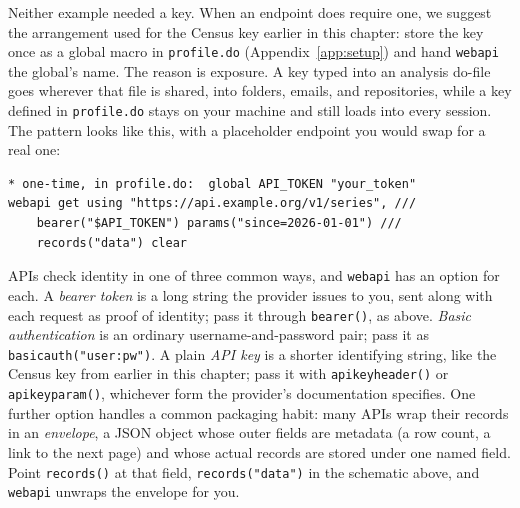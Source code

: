 Neither example needed a key. When an endpoint does require one, we suggest the arrangement used for the Census key earlier in this chapter: store the key once as a global macro in \texttt{profile.do} (Appendix~\ref{app:setup}) and hand \texttt{webapi} the global's name. The reason is exposure. A key typed into an analysis do-file goes wherever that file is shared, into folders, emails, and repositories, while a key defined in \texttt{profile.do} stays on your machine and still loads into every session. The pattern looks like this, with a placeholder endpoint you would swap for a real one:
\par
{\footnotesize
\begin{verbatim}
* one-time, in profile.do:  global API_TOKEN "your_token"
webapi get using "https://api.example.org/v1/series", ///
    bearer("$API_TOKEN") params("since=2026-01-01") ///
    records("data") clear
\end{verbatim}
}
APIs check identity in one of three common ways, and \texttt{webapi} has an option for each. A \emph{bearer token} is a long string the provider issues to you, sent along with each request as proof of identity; pass it through \texttt{bearer()}, as above. \emph{Basic authentication} is an ordinary username-and-password pair; pass it as \texttt{basicauth("user:pw")}. A plain \emph{API key} is a shorter identifying string, like the Census key from earlier in this chapter; pass it with \texttt{apikeyheader()} or \texttt{apikeyparam()}, whichever form the provider's documentation specifies. One further option handles a common packaging habit: many APIs wrap their records in an \emph{envelope}, a JSON object whose outer fields are metadata (a row count, a link to the next page) and whose actual records are stored under one named field. Point \texttt{records()} at that field, \texttt{records("data")} in the schematic above, and \texttt{webapi} unwraps the envelope for you.

